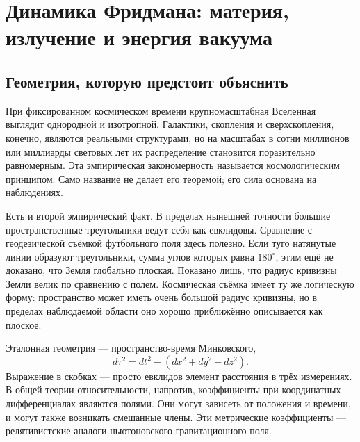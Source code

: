\chapter{Динамика Фридмана: материя, излучение и энергия вакуума}


\section{Геометрия, которую предстоит объяснить}

При фиксированном космическом времени крупномасштабная Вселенная выглядит однородной и
изотропной. Галактики, скопления и сверхскопления, конечно, являются реальными структурами,
но на масштабах в сотни миллионов или миллиарды световых лет их
распределение становится поразительно равномерным. Эта эмпирическая
закономерность называется космологическим принципом. Само название не делает его
теоремой; его сила основана на наблюдениях.

Есть и второй эмпирический факт. В пределах нынешней точности большие
пространственные треугольники ведут себя как евклидовы. Сравнение с
геодезической съёмкой футбольного поля здесь полезно. Если туго натянутые
линии образуют треугольники, сумма углов которых равна \(180^\circ\), этим ещё не доказано, что Земля
глобально плоская. Показано лишь, что радиус кривизны Земли велик по сравнению
с полем. Космическая съёмка имеет ту же логическую форму: пространство может иметь очень
большой радиус кривизны, но в пределах наблюдаемой области оно хорошо
приближённо описывается как плоское.

Эталонная геометрия — пространство-время Минковского,
\begin{equation}
  d\tau^2=dt^2-\left(dx^2+dy^2+dz^2\right).
  \label{eq:l09-minkowski}
\end{equation}
Выражение в скобках — просто евклидов элемент расстояния в трёх измерениях. В
общей теории относительности, напротив, коэффициенты при координатных
дифференциалах являются полями. Они могут зависеть от положения и времени, и могут также возникать смешанные члены.
Эти метрические коэффициенты — релятивистские аналоги ньютоновского
гравитационного поля.

